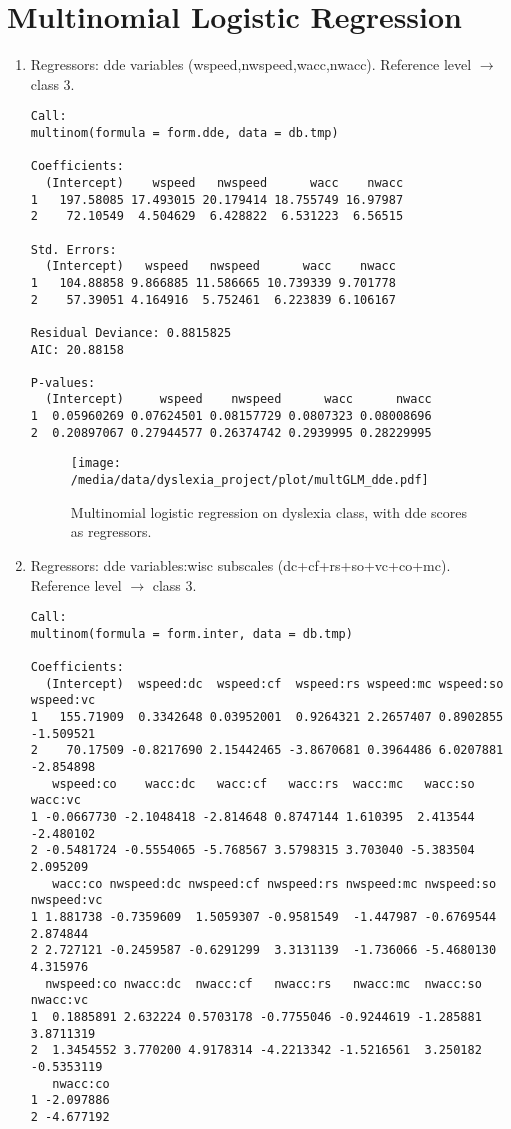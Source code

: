 \documentclass[11pt, a4paper, twoside, openright]{article}
\begin{document}
\section{Multinomial Logistic Regression}
\begin{enumerate}
\item Regressors: dde variables (wspeed,nwspeed,wacc,nwacc). Reference
  level $\longrightarrow$ class $3$.
\begin{verbatim}
Call:
multinom(formula = form.dde, data = db.tmp)

Coefficients:
  (Intercept)    wspeed   nwspeed      wacc    nwacc
1   197.58085 17.493015 20.179414 18.755749 16.97987
2    72.10549  4.504629  6.428822  6.531223  6.56515

Std. Errors:
  (Intercept)   wspeed   nwspeed      wacc    nwacc
1   104.88858 9.866885 11.586665 10.739339 9.701778
2    57.39051 4.164916  5.752461  6.223839 6.106167

Residual Deviance: 0.8815825 
AIC: 20.88158 

P-values:
  (Intercept)     wspeed    nwspeed      wacc      nwacc
1  0.05960269 0.07624501 0.08157729 0.0807323 0.08008696
2  0.20897067 0.27944577 0.26374742 0.2939995 0.28229995
\end{verbatim}
\begin{figure}[h!] 
\centering
\texttt{[image: /media/data/dyslexia\_project/plot/multGLM\_dde.pdf]}
\caption{Multinomial logistic regression on dyslexia class, with dde scores as regressors.}
\label{fig:18}
\end{figure}  

\clearpage

\item Regressors: dde variables:wisc subscales
  (dc+cf+rs+so+vc+co+mc). Reference level $\longrightarrow$ class $3$.
\begin{verbatim}
Call:
multinom(formula = form.inter, data = db.tmp)

Coefficients:
  (Intercept)  wspeed:dc  wspeed:cf  wspeed:rs wspeed:mc wspeed:so wspeed:vc
1   155.71909  0.3342648 0.03952001  0.9264321 2.2657407 0.8902855 -1.509521
2    70.17509 -0.8217690 2.15442465 -3.8670681 0.3964486 6.0207881 -2.854898
   wspeed:co    wacc:dc   wacc:cf   wacc:rs  wacc:mc   wacc:so   wacc:vc
1 -0.0667730 -2.1048418 -2.814648 0.8747144 1.610395  2.413544 -2.480102
2 -0.5481724 -0.5554065 -5.768567 3.5798315 3.703040 -5.383504  2.095209
   wacc:co nwspeed:dc nwspeed:cf nwspeed:rs nwspeed:mc nwspeed:so nwspeed:vc
1 1.881738 -0.7359609  1.5059307 -0.9581549  -1.447987 -0.6769544   2.874844
2 2.727121 -0.2459587 -0.6291299  3.3131139  -1.736066 -5.4680130   4.315976
  nwspeed:co nwacc:dc  nwacc:cf   nwacc:rs   nwacc:mc  nwacc:so   nwacc:vc
1  0.1885891 2.632224 0.5703178 -0.7755046 -0.9244619 -1.285881  3.8711319
2  1.3454552 3.770200 4.9178314 -4.2213342 -1.5216561  3.250182 -0.5353119
   nwacc:co
1 -2.097886
2 -4.677192


\end{verbatim}
\end{enumerate}
\end{document}
